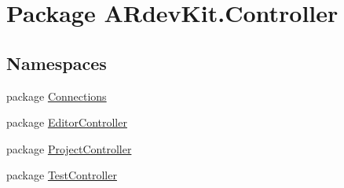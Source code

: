 \hypertarget{namespace_a_rdev_kit_1_1_controller}{\section{Package A\-Rdev\-Kit.\-Controller}
\label{namespace_a_rdev_kit_1_1_controller}
}
\subsection*{Namespaces}
\begin{DoxyCompactItemize}
\item 
package \hyperlink{namespace_a_rdev_kit_1_1_controller_1_1_connections}{Connections}
\item 
package \hyperlink{namespace_a_rdev_kit_1_1_controller_1_1_editor_controller}{Editor\-Controller}
\item 
package \hyperlink{namespace_a_rdev_kit_1_1_controller_1_1_project_controller}{Project\-Controller}
\item 
package \hyperlink{namespace_a_rdev_kit_1_1_controller_1_1_test_controller}{Test\-Controller}
\end{DoxyCompactItemize}
